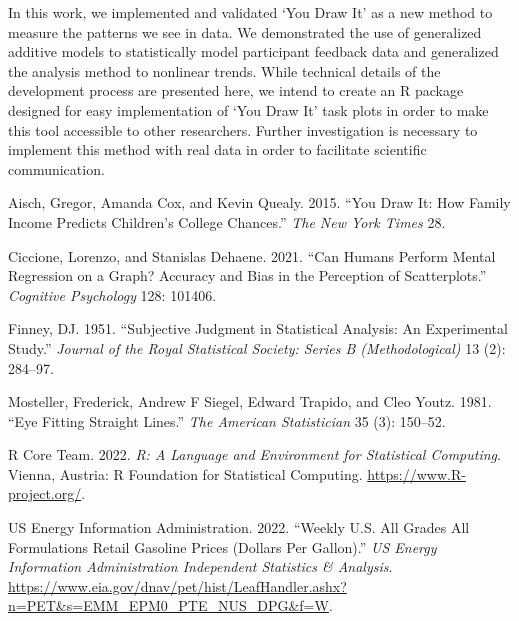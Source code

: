 \documentclass[
  letterpaper,
  DIV=11,
  numbers=noendperiod]{scrartcl}
\newlength{\cslhangindent}
\newlength{\cslentryspacingunit} %
\newenvironment{CSLReferences}[2] %
 {%
  \setlength{\parindent}{0pt}
  \ifodd #1
  \let\oldpar\par
  \def\par{\hangindent=\cslhangindent\oldpar}
  \fi
  \setlength{\parskip}{#2\cslentryspacingunit}
 }%
 {}
\begin{document}
In this work, we implemented and validated `You Draw It' as a new method
to measure the patterns we see in data. We demonstrated the use of
generalized additive models to statistically model participant feedback
data and generalized the analysis method to nonlinear trends. While
technical details of the development process are presented here, we
intend to create an R package designed for easy implementation of `You
Draw It' task plots in order to make this tool accessible to other
researchers. Further investigation is necessary to implement this method
with real data in order to facilitate scientific communication.

\hypertarget{refs}{}
\begin{CSLReferences}{1}{0}
\leavevmode{}%
Aisch, Gregor, Amanda Cox, and Kevin Quealy. 2015. {``You Draw It: How
Family Income Predicts Children's College Chances.''} \emph{The New York
Times} 28.

\leavevmode{}%
Ciccione, Lorenzo, and Stanislas Dehaene. 2021. {``Can Humans Perform
Mental Regression on a Graph? Accuracy and Bias in the Perception of
Scatterplots.''} \emph{Cognitive Psychology} 128: 101406.

\leavevmode{}%
Finney, DJ. 1951. {``Subjective Judgment in Statistical Analysis: An
Experimental Study.''} \emph{Journal of the Royal Statistical Society:
Series B (Methodological)} 13 (2): 284--97.

\leavevmode{}%
Mosteller, Frederick, Andrew F Siegel, Edward Trapido, and Cleo Youtz.
1981. {``Eye Fitting Straight Lines.''} \emph{The American Statistician}
35 (3): 150--52.

\leavevmode{}%
R Core Team. 2022. \emph{R: A Language and Environment for Statistical
Computing}. Vienna, Austria: R Foundation for Statistical Computing.
\url{https://www.R-project.org/}.

\leavevmode{}%
US Energy Information Administration. 2022. {``Weekly {U}.{S}. {All}
{Grades} {All} {Formulations} {Retail} {Gasoline} {Prices} ({Dollars}
Per {Gallon}).''} \emph{US Energy Information Administration Independent
Statistics \& Analysis}.
\url{https://www.eia.gov/dnav/pet/hist/LeafHandler.ashx?n=PET\&s=EMM_EPM0_PTE_NUS_DPG\&f=W}.

\end{CSLReferences}
\end{document}
